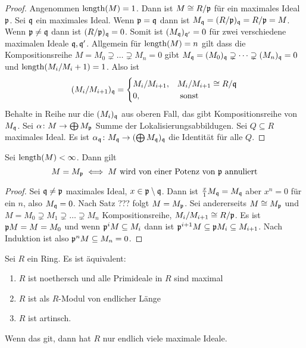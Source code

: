 \begin{proof}
    Angenommen $\operatorname{length}(M)=1$. Dann ist $M\cong R/\mathfrak{p}$ für ein maximales Ideal $\mathfrak{p}$. Sei $\mathfrak{q}$ ein maximales Ideal. Wenn $\mathfrak{p}=\mathfrak{q}$ dann ist $M_{\mathfrak{q}}=(R/\mathfrak{p})_{\mathfrak{q}}=R/\mathfrak{p}=M$.
    Wenn $\mathfrak{p}\neq\mathfrak{q}$ dann ist $(R/\mathfrak{p})_{\mathfrak{q}}=0$. Somit ist $(M_{\mathfrak{q}})_{\mathfrak{q}'}=0$ für zwei verschiedene maximalen Ideale $\mathfrak{q},\mathfrak{q}'$. Allgemein für $\operatorname{length}(M)=n$ gilt dass die Kompositionsreihe $M=M_0\supsetneq \dots\supsetneq M_n=0$ gibt $M_{\mathfrak{q}}=(M_0)_{\mathfrak{q}}\supsetneq \dots\supsetneq (M_n)_{\mathfrak{q}}=0$ und $\operatorname{length}(M_i/M_i+1)=1$. Also ist 
    $$(M_i/M_{i+1})_{\mathfrak{q}}=\begin{cases}
        M_i/M_{i+1}, & M_i/M_{i+1}\cong R/\mathfrak{q}\\
        0 , &\text{ sonst}
    \end{cases}$$
    Behalte in Reihe nur die $(M_i)_{\mathfrak{q}}$ aus oberen Fall, das gibt Kompositionsreihe von $M_{\mathfrak{q}}$.
    Sei $\alpha\colon M\to \bigoplus M_{\mathfrak{p}}$ Summe der Lokalisierungsabbildugen. Sei $Q\subseteq R$ maximales Ideal. Es ist $\alpha_{\mathfrak{q}}\colon M_{\mathfrak{q}}\to (\bigoplus M_{\mathfrak{q}})_{\mathfrak{q}}$ die Identität für alle $Q$.
\end{proof}
\begin{Satz}
    Sei $\operatorname{length}(M)<\infty$. Dann gilt
    $$M=M_{\mathfrak{p}}\iff M\text{ wird von einer Potenz von $\mathfrak{p}$ annuliert}$$
\end{Satz}
\begin{proof}
    Sei $\mathfrak{q}\neq\mathfrak{p}$ maximales Ideal, $x\in\mathfrak{p}\setminus\mathfrak{q}$. Dann ist $\frac x 1 M_{\mathfrak{q}}=M_{\mathfrak{q}}$ aber $x^n=0$ für ein $n$, also $M_{\mathfrak{q}}=0$.
    Nach Satz ??? folgt $M=M_{\mathfrak{p}}$.
    Sei andererseits $M\cong M_{\mathfrak{p}}$ und $M=M_0\supsetneq M_1\supsetneq \dots \supsetneq M_n$ Kompositionsreihe, $M_i/M_{i+1}\cong R/\mathfrak{p}$. Es ist $\mathfrak{p} M=M=M_0$ und wenn $\mathfrak{p}^iM\subseteq M_i$ dann ist $\mathfrak{p}^{i+1}M\subseteq \mathfrak{p} M_i\subseteq M_{i+1}$. Nach Induktion ist also $\mathfrak{p}^nM\subseteq M_n=0$.
\end{proof}
\begin{Satz}
    Sei $R$ ein Ring. Es ist äquivalent:
    \begin{enumerate}
        \item $R$ ist noethersch und alle Primideale in $R$ sind maximal
        \item $R$ ist als $R$-Modul von endlicher Länge
        \item $R$ ist artinsch.
    \end{enumerate}
    Wenn das git, dann hat $R$ nur endlich viele maximale Ideale.
\end{Satz}
